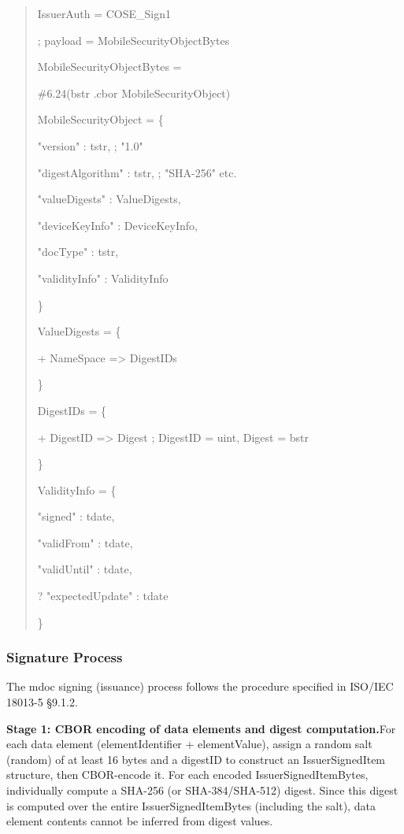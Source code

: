\documentclass[conference]{IEEEtran}
\begin{document}
\begin{quote}
IssuerAuth = COSE\_Sign1

; payload = MobileSecurityObjectBytes

MobileSecurityObjectBytes =

\#6.24(bstr .cbor MobileSecurityObject)

MobileSecurityObject = \{

"version" : tstr, ; "1.0"

"digestAlgorithm" : tstr, ; "SHA-256" etc.

"valueDigests" : ValueDigests,

"deviceKeyInfo" : DeviceKeyInfo,

"docType" : tstr,

"validityInfo" : ValidityInfo

\}

ValueDigests = \{

+ NameSpace =\textgreater{} DigestIDs

\}

DigestIDs = \{

+ DigestID =\textgreater{} Digest ; DigestID = uint, Digest = bstr

\}

ValidityInfo = \{

"signed" : tdate,

"validFrom" : tdate,

"validUntil" : tdate,

? "expectedUpdate" : tdate

\}
\end{quote}

\subsubsection{Signature Process}

The mdoc signing (issuance) process follows the procedure specified in ISO/IEC 18013-5 §9.1.2.

\textbf{Stage 1: CBOR encoding of data elements and digest computation.}For each data element (elementIdentifier + elementValue), assign a random salt (random) of at least 16 bytes and a digestID to construct an IssuerSignedItem structure, then CBOR-encode it. For each encoded IssuerSignedItemBytes, individually compute a SHA-256 (or SHA-384/SHA-512) digest. Since this digest is computed over the entire IssuerSignedItemBytes (including the salt), data element contents cannot be inferred from digest values.
\end{document}
